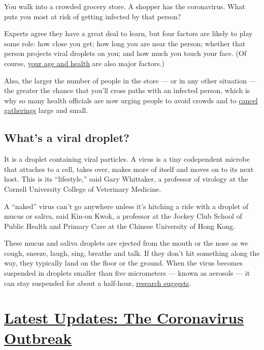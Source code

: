 You walk into a crowded grocery store. A shopper has the coronavirus.
What puts you most at risk of getting infected by that person?

Experts agree they have a great deal to learn, but four factors are
likely to play some role: how close you get; how long you are near the
person; whether that person projects viral droplets on you; and how much
you touch your face. (Of course,
\href{https://www.nytimes3xbfgragh.onion/2020/02/20/health/coronavirus-men-women.html}{your
age and health} are also major factors.)

Also, the larger the number of people in the store --- or in any other
situation --- the greater the chance that you'll cross paths with an
infected person, which is why so many health officials are now urging
people to avoid crowds and to
\href{https://www.cdc.gov/coronavirus/2019-ncov/community/large-events/mass-gatherings-ready-for-covid-19.html}{cancel
gatherings} large and small.

\hypertarget{whats-a-viral-droplet}{%
\subsection{What's a viral droplet?}\label{whats-a-viral-droplet}}

It is a droplet containing viral particles. A virus is a tiny
codependent microbe that attaches to a cell, takes over, makes more of
itself and moves on to its next host. This is its ``lifestyle,'' said
Gary Whittaker, a professor of virology at the Cornell University
College of Veterinary Medicine.

A ``naked'' virus can't go anywhere unless it's hitching a ride with a
droplet of mucus or saliva, said Kin-on Kwok, a professor at the Jockey
Club School of Public Health and Primary Care at the Chinese University
of Hong Kong.

These mucus and saliva droplets are ejected from the mouth or the nose
as we cough, sneeze, laugh, sing, breathe and talk. If they don't hit
something along the way, they typically land on the floor or the ground.
When the virus becomes suspended in droplets smaller than five
micrometers --- known as aerosols --- it can stay suspended for about a
half-hour,
\href{https://www.nytimes3xbfgragh.onion/2020/03/17/health/coronavirus-surfaces-aerosols.html}{research
suggests}.

\hypertarget{latest-updates-the-coronavirus-outbreak}{%
\section{\texorpdfstring{\href{https://www.nytimes3xbfgragh.onion/2020/09/08/world/covid-19-coronavirus.html?action=click\&pgtype=Article\&state=default\&region=MAIN_CONTENT_1\&context=storylines_live_updates}{Latest
Updates: The Coronavirus
Outbreak}}{Latest Updates: The Coronavirus Outbreak}}\label{latest-updates-the-coronavirus-outbreak}}

